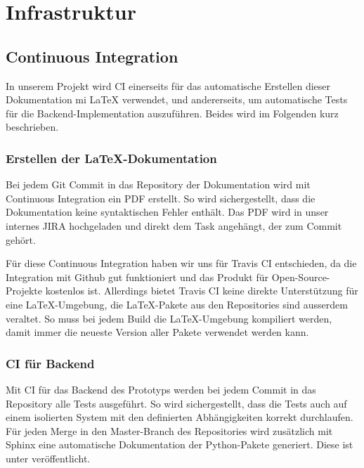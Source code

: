 
\section{Infrastruktur}
\label{sec:Infrastruktur}

\subsection{Continuous Integration}
\label{sub:Continuous Integration}

In unserem Projekt wird \ac{CI} einerseits für das automatische Erstellen dieser Dokumentation mi LaTeX verwendet, und andererseits, um automatische Tests für die Backend-Implementation auszuführen. Beides wird im Folgenden kurz beschrieben.

\subsubsection{Erstellen der LaTeX-Dokumentation}
\label{subsub:Erstellen der LaTeX-Dokumentation}

Bei jedem Git Commit in das Repository der Dokumentation \cite{github:PlazaRoute-doc} wird mit Continuous Integration ein PDF erstellt. So wird sichergestellt, dass die Dokumentation keine syntaktischen Fehler enthält. Das PDF wird in unser internes JIRA hochgeladen und direkt dem Task angehängt, der zum Commit gehört.

Für diese Continuous Integration haben wir uns für Travis CI \cite{travis-ci} entschieden, da die Integration mit Github gut funktioniert und das Produkt für Open-Source-Projekte kostenlos ist. Allerdings bietet Travis CI keine direkte Unterstützung für eine LaTeX-Umgebung, die LaTeX-Pakete aus den Repositories sind ausserdem veraltet. So muss bei jedem Build die LaTeX-Umgebung kompiliert werden, damit immer die neueste Version aller Pakete verwendet werden kann.

\subsubsection{CI für Backend}

Mit \ac{CI} für das Backend des Prototyps werden bei jedem Commit in das Repository \cite{github:PlazaRoute} alle Tests ausgeführt. So wird sichergestellt, dass die Tests auch auf einem isolierten System mit den definierten Abhängigkeiten korrekt durchlaufen. Für jeden Merge in den Master-Branch des Repositories wird zusätzlich mit Sphinx \cite{sphinx} eine automatische Dokumentation der Python-Pakete generiert. Diese ist unter \cite{PlazaRoute-apidoc} veröffentlicht.

